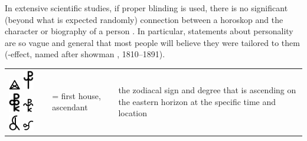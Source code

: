 \documentclass[british,final,landscape]{scrartcl}
\begin{document}
\begin{refsection}
In extensive scientific studies, if proper blinding is used, there is no significant (beyond what is expected randomly) connection between a horoskop and the character or biography of a person \parencite{Car-83, Fic-83, Wun-08}. In particular, statements about personality are so vague and general that most people will believe they were tailored to them \parencite{For-49} (-effect, named after showman , 1810--1891).

 \tablelasttail{\bottomrule}
 \begin{supertabular}{p{0.3\textwidth}p{0.34\textwidth}p{0.34\textwidth}}
  \includegraphics[width=5mm]{Astrology/Ascendant}  \includegraphics[width=5mm]{Astrology/Ascendant2} \includegraphics[width=5mm]{Astrology/Ascendant3} \includegraphics[width=5mm]{Astrology/Ascendant4} \includegraphics[width=5mm]{Astrology/Ascendant5} \includegraphics[width=5mm]{Astrology/Ascendant6} &  = first house, ascendant & the zodiacal sign and degree that is ascending on the eastern horizon at the specific time and location\\

\end{supertabular}
\end{refsection}
\end{document}
